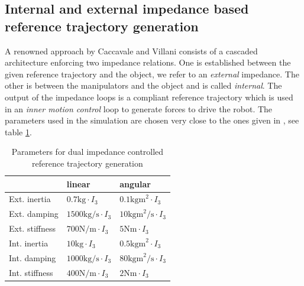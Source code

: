 \documentclass[a4paper,twoside, openright,12pt]{report}
\begin{document}
{\subsection{Internal and external impedance based reference trajectory generation}
A renowned approach by Caccavale and Villani \cite{Caccavale_01, Caccavale_08} consists of a cascaded architecture enforcing two impedance relations. One is established between the given reference trajectory and the object, we refer to an \emph{external} impedance. The other is between the manipulators and the object and is called \emph{internal}. The output of the impedance loops is a compliant reference trajectory which is used in an \emph{inner motion control} loop to generate forces to drive the robot. The parameters used in the simulation are chosen very close to the ones given in \cite{Caccavale_08}, see table \ref{TAB:CaViParameters}. 

\begin{table}[b]
	\centering
	\caption[Parameters for dual impedance controlled reference trajectory generation]{Parameters for dual impedance controlled reference trajectory generation}\vspace{10pt}
	\label{TAB:CaViParameters}
	
	\begin{tabular}{ l | l | l }
	 & linear & angular \\ \hline
	Ext. inertia & $0.7 \text{kg} \cdot I_3$ & $0.1 \text{kgm}^2 \cdot I_3$ \\ \hline
	Ext. damping	 & $1500 \text{kg/s} \cdot I_3$ & $10 \text{kgm}^2 \text{/s} \cdot I_3$ \\ \hline
	Ext. stiffness & $700 \text{N/m} \cdot I_3$ & $5 \text{Nm} \cdot  I_3$ \\ \hline
	Int. inertia & $10 \text{kg} \cdot I_3$ & $0.5 \text{kgm}^2 \cdot I_3$ \\ \hline
	Int. damping & $1000 \text{kg/s} \cdot I_3$ & $80 \text{kgm}^2 \text{/s} \cdot I_3 $ \\ \hline
	Int. stiffness & $400 \text{N/m} \cdot I_3$ & $2 \text{Nm} \cdot I_3$\\ \hline
\end{tabular}
\end{table}


}
\end{document}
